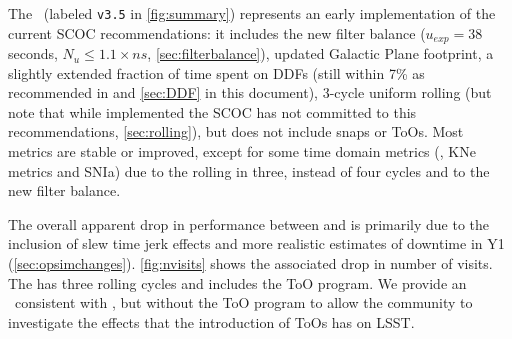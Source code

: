  The  \opsim\ (labeled \texttt{v3.5} in \autoref{fig:summary}) represents an early implementation of the current SCOC recommendations: it includes the new filter balance ($u_{exp}=38$ seconds, $N_u \leq1.1\times ns$, \autoref{sec:filterbalance}), updated Galactic Plane footprint, a slightly extended fraction of time spent on DDFs (still within 7\% as recommended in  and \autoref{sec:DDF} in this document), 3-cycle uniform rolling (but note that while implemented the SCOC has not committed to this recommendations, \autoref{sec:rolling}), but does not include snaps or ToOs. Most metrics are stable or improved, except for some time domain metrics (\eg, KNe metrics and SNIa) due to the rolling in three, instead of four cycles and to the new filter balance. 
 
 The overall apparent drop in performance between  and  is primarily due to the inclusion of slew time jerk effects and more realistic estimates of downtime in Y1 (\autoref{sec:opsimchanges}). \autoref{fig:nvisits} shows the associated drop in number of visits. The  has three rolling cycles and includes the ToO program. We provide an \opsim\ consistent with , but without the ToO program to allow the community to investigate the effects that the introduction of ToOs has on LSST. 
 
